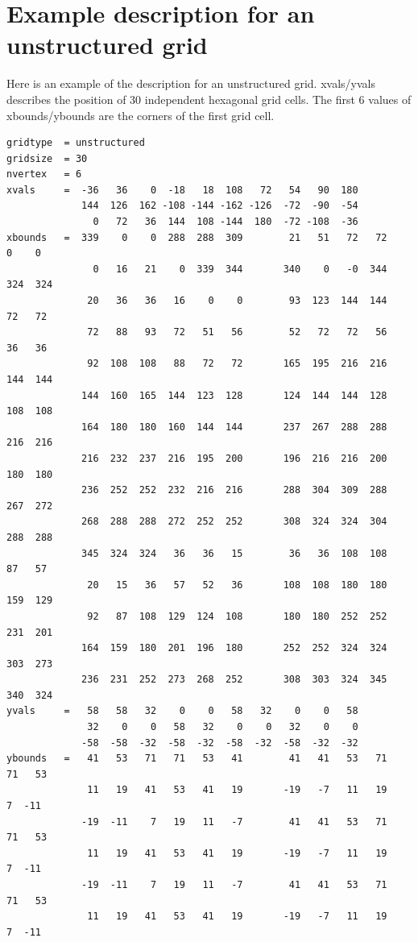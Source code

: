 \section{Example description for an unstructured grid}
Here is an example of the {\CDO} description for an unstructured grid.
xvals/yvals describes the position of 30 independent hexagonal grid cells.
The first 6 values of xbounds/ybounds are the corners of the first grid cell.
\begin{lstlisting}[frame=single, backgroundcolor=\color{pyellow}, basicstyle=\footnotesize]
gridtype  = unstructured
gridsize  = 30
nvertex   = 6
xvals     =  -36   36    0  -18   18  108   72   54   90  180 
             144  126  162 -108 -144 -162 -126  -72  -90  -54
               0   72   36  144  108 -144  180  -72 -108  -36 
xbounds   =  339    0    0  288  288  309        21   51   72   72    0    0
               0   16   21    0  339  344       340    0   -0  344  324  324
              20   36   36   16    0    0        93  123  144  144   72   72
              72   88   93   72   51   56        52   72   72   56   36   36
              92  108  108   88   72   72       165  195  216  216  144  144
             144  160  165  144  123  128       124  144  144  128  108  108
             164  180  180  160  144  144       237  267  288  288  216  216
             216  232  237  216  195  200       196  216  216  200  180  180
             236  252  252  232  216  216       288  304  309  288  267  272
             268  288  288  272  252  252       308  324  324  304  288  288
             345  324  324   36   36   15        36   36  108  108   87   57
              20   15   36   57   52   36       108  108  180  180  159  129
              92   87  108  129  124  108       180  180  252  252  231  201
             164  159  180  201  196  180       252  252  324  324  303  273
             236  231  252  273  268  252       308  303  324  345  340  324
yvals     =   58   58   32    0    0   58   32    0    0   58
              32    0    0   58   32    0    0   32    0    0
             -58  -58  -32  -58  -32  -58  -32  -58  -32  -32 
ybounds   =   41   53   71   71   53   41        41   41   53   71   71   53
              11   19   41   53   41   19       -19   -7   11   19    7  -11
             -19  -11    7   19   11   -7        41   41   53   71   71   53
              11   19   41   53   41   19       -19   -7   11   19    7  -11
             -19  -11    7   19   11   -7        41   41   53   71   71   53
              11   19   41   53   41   19       -19   -7   11   19    7  -11

\end{lstlisting}
